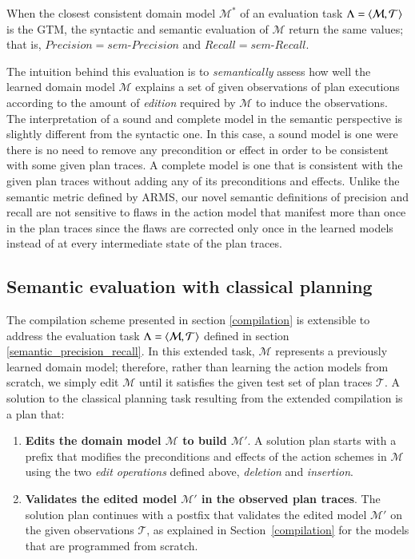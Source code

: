\begin{myproposition}
When the closest consistent domain model $\mathcal{M^*}$ of an evaluation task $\Lambda = {\langle \mathcal{M}, \mathcal{T} \rangle}$ is the GTM, the syntactic and semantic evaluation of $\mathcal{M}$ return the same values; that is, $Precision=sem\text{-}Precision$ and $Recall=sem\text{-}Recall$.
\end{myproposition}


The intuition behind this evaluation is to {\em semantically} assess how well the learned domain model $\mathcal{M}$ explains a set of given observations of plan executions according to the amount of {\em edition} required by $\mathcal{M}$ to induce the observations. The interpretation of a sound and complete model in the semantic perspective is slightly different from the syntactic one. In this case, a sound model is one were there is no need to remove any precondition or effect in order to be consistent with some given plan traces. A complete model is one that is consistent with the given plan traces without adding any of its preconditions and effects. Unlike the semantic metric defined by ARMS, our novel semantic definitions of precision and recall are not sensitive to flaws in the action model that manifest more than once in the plan traces since the flaws are corrected only once in the learned models instead of at every intermediate state of the plan traces.


\subsection{Semantic evaluation with classical planning}
\label{edit_distance}


The compilation scheme presented in section \ref{compilation} is extensible to address the evaluation task $\Lambda={\langle \mathcal{M}, \mathcal{T} \rangle}$ defined in section \ref{semantic_precision_recall}. In this extended task, $\mathcal{M}$ represents a previously learned domain model; therefore, rather than learning the action models from scratch, we simply edit $\mathcal{M}$ until it satisfies the given test set of plan traces $\mathcal{T}$. A solution to the classical planning task resulting from the extended compilation is a plan that:

\begin{enumerate}
\item {\bf Edits the domain model $\mathcal{M}$ to build $\mathcal{M}'$}. A solution plan starts with a prefix that modifies the preconditions and effects of the action schemes in $\mathcal{M}$ using the two {\em edit operations} defined above, {\em deletion} and {\em insertion}.
\item {\bf Validates the edited model $\mathcal{M}'$ in the observed plan traces}. The solution plan continues with a postfix that validates the edited model $\mathcal{M}'$ on the given observations $\mathcal{T}$, as explained in Section~\ref{compilation} for the models that are programmed from scratch.
\end{enumerate}

